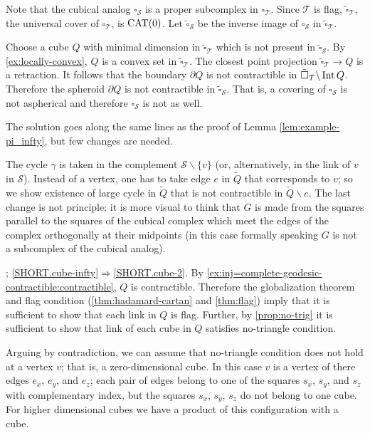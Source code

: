 Note that the cubical analog $\square_{\mathcal{S}}$ is a proper subcomplex in $\square_{\mathcal{T}}$.
Since $\mathcal{T}$ is flag,
$\tilde\square_{\mathcal{T}}$,
the universal cover of $\square_{\mathcal{T}}$, is $\mathrm{CAT}(0)$.
Let $\tilde\square_{\mathcal{S}}$ be the inverse image of $\square_{\mathcal{S}}$ in $\tilde\square_{\mathcal{T}}$.

Choose a cube $Q$ with minimal dimension in $\tilde\square_{\mathcal{T}}$ which is not present in $\tilde\square_{\mathcal{S}}$.
By \ref{ex:locally-convex}, $Q$ is a convex set in $\tilde\square_{\mathcal{T}}$.
The closest point projection $\tilde\square_{\mathcal{T}}\to Q$ is a retraction.
It follows that the boundary $\partial Q$ is not contractible in $\tilde\square_{\mathcal{T}}\backslash\operatorname{\rm Int}\nolimits Q$.
Therefore the spheroid $\partial Q$ is not contractible in $\tilde\square_{\mathcal{S}}$.
That is, a covering of $\square_{\mathcal{S}}$ is not aspherical and therefore $\square_{\mathcal{S}}$ is not as well.

The solution goes along the same lines as the proof of Lemma \ref{lem:example-pi_infty}, but few changes are needed.

The cycle $\gamma$ is taken in the complement $\mathcal{S}\backslash\{v\}$ (or, alternatively, in the link of $v$ in $\mathcal{S}$).
Instead of a vertex, one has to take edge $e$ in $\tilde Q$ that corresponds to $v$; so we show existence of large cycle in $\tilde Q$ that is not contractible in $\tilde Q\backslash e$.
The last change is not principle:
it is more visual to think that $G$ is made from the squares parallel to the squares of the cubical complex which meet the edges of the complex orthogonally at their midpoints (in this case formally speaking $G$ is not a subcomplex of the cubical analog).

\parbf{\ref{ex:cube-infty=>cube-2}}; \ref{SHORT.cube-infty}$\Rightarrow$\ref{SHORT.cube-2}.
By \ref{ex:inj=complete-geodesic-contractible:contractible}, $Q$ is contractible.
Therefore the globalization theorem and flag condition (\ref{thm:hadamard-cartan} and \ref{thm:flag}) imply that it is sufficient to show that each link in $Q$ is flag.
Further, by \ref{prop:no-trig} it is sufficient to show that link of each cube in $Q$ satisfies no-triangle condition.

Arguing by contradiction, we can assume that no-triangle condition does not hold at a vertex $v$; that is, a zero-dimensional cube.
In this case $v$ is a vertex of there edges $e_x$, $e_y$, and $e_z$;
each pair of edges belong to one of the squares $s_x$, $s_y$, and $s_z$ with complementary index, but the squares $s_x$, $s_y$, $s_z$ do not belong to one cube.
For higher dimensional cubes we have a product of this configuration with a cube.

